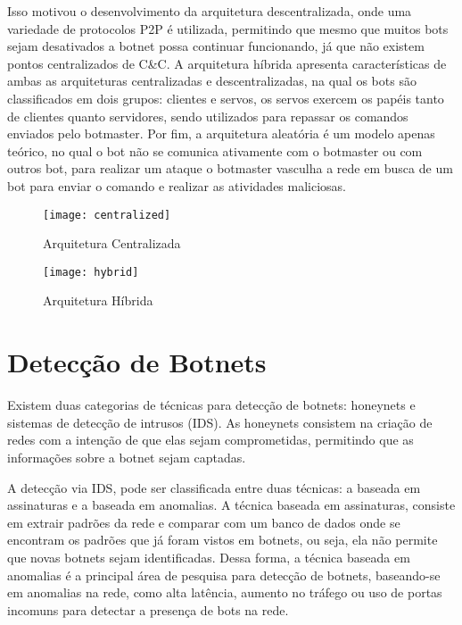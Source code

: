 Isso motivou o desenvolvimento da arquitetura descentralizada, onde uma variedade de protocolos P2P é utilizada, permitindo que mesmo que muitos bots sejam desativados a botnet possa continuar funcionando, já que não existem pontos centralizados de C\&C. A arquitetura híbrida apresenta características de ambas as arquiteturas centralizadas e descentralizadas, na qual os bots são classificados em dois grupos: clientes e servos, os servos exercem os papéis tanto de clientes quanto servidores, sendo utilizados para repassar os comandos enviados pelo botmaster. Por fim, a arquitetura aleatória é um modelo apenas teórico, no qual o bot não se comunica ativamente com o botmaster ou com outros bot, para realizar um ataque o botmaster vasculha a rede em busca de um bot para enviar o comando e realizar as atividades maliciosas.

\begin{figure}
\texttt{[image: centralized]}
\caption[Arquitetura Centralizada]{Arquitetura Centralizada\cite{wang2010advanced}} \label{fig:centralized_architecture}
\end{figure}

\begin{figure}
\texttt{[image: hybrid]}
\caption[Arquitetura Híbrida]{Arquitetura Híbrida\cite{wang2010advanced}} \label{fig:hybrid_architecture}
\end{figure}

\section{Detecção de Botnets}

Existem duas categorias de técnicas para detecção de botnets: honeynets e sistemas de detecção de intrusos (IDS). As honeynets consistem na criação de redes com a intenção de que elas sejam comprometidas, permitindo que as informações sobre a botnet sejam captadas.

A detecção via IDS, pode ser classificada entre duas técnicas: a baseada em assinaturas e a baseada em anomalias. A técnica baseada em assinaturas, consiste em extrair padrões da rede e comparar com um banco de dados onde se encontram os padrões que já foram vistos em botnets, ou seja, ela não permite que novas botnets sejam identificadas. Dessa forma, a técnica baseada em anomalias é a principal área de pesquisa para detecção de botnets, baseando-se em anomalias na rede, como alta latência, aumento no tráfego ou uso de portas incomuns para detectar a presença de bots na rede.

